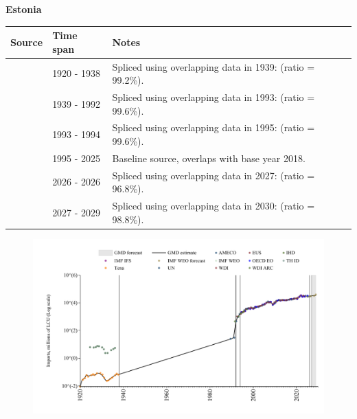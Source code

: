 \documentclass[12pt,a4paper,landscape]{article}
\begin{document}
\begin{adjustbox}{max totalsize={\paperwidth}{\paperheight},center}
\begin{minipage}[t][\textheight][t]{\textwidth}
\vspace*{0.5cm}
{}
\begin{center}
{\Large\bfseries Estonia}
\end{center}
\vspace{0.5cm}
\begin{table}[H]
\centering
\small
\begin{tabular}{|l|l|l|}
\hline
\textbf{Source} & \textbf{Time span} & \textbf{Notes} \\
\hline
\rowcolor{white}\cite{Tena}& 1920 - 1938 &Spliced using overlapping data in 1939: (ratio = 99.2\%).\\
\rowcolor{lightgray}\cite{UN}& 1939 - 1992 &Spliced using overlapping data in 1993: (ratio = 99.6\%).\\
\rowcolor{white}\cite{AMECO}& 1993 - 1994 &Spliced using overlapping data in 1995: (ratio = 99.6\%).\\
\rowcolor{lightgray}\cite{OECD_EO}& 1995 - 2025 &Baseline source, overlaps with base year 2018.\\
\rowcolor{white}\cite{AMECO}& 2026 - 2026 &Spliced using overlapping data in 2027: (ratio = 96.8\%).\\
\rowcolor{lightgray}\cite{IMF_WEO_forecast}& 2027 - 2029 &Spliced using overlapping data in 2030: (ratio = 98.8\%).\\
\hline
\end{tabular}
\end{table}
\begin{figure}[H]
\centering
\includegraphics[width=\textwidth,height=0.6\textheight,keepaspectratio]{graphs/EST_imports.pdf}
\end{figure}
\end{minipage}
\end{adjustbox}
\end{document}
